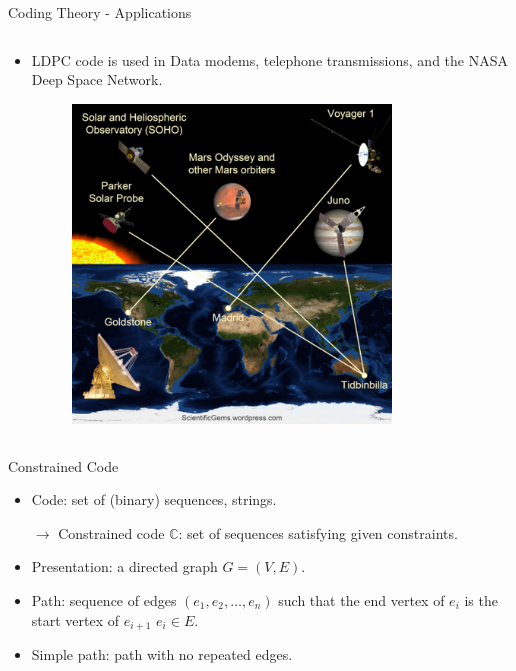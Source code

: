 \begin{frame}{Coding Theory - Applications}
\begin{columns}
        \begin{column}{0.5\textwidth}
            \begin{itemize}
                \vfill \item LDPC code is used in Data modems, telephone transmissions, and the NASA Deep Space Network.
                \begin{figure}
                    \centering
                    \includegraphics[width=0.8\textwidth,height=0.6\textheight]{Images/Introduction/NASA.png}
                \end{figure}
            \end{itemize}
        \end{column}
    \end{columns}
\end{frame}


\begin{frame}{Constrained Code}
    \begin{itemize}
        \vfill \item Code: set of (binary) sequences, strings.
        
        $\rightarrow$ Constrained code $\mathbb{C}$: set of sequences satisfying given constraints.
        \vfill \item Presentation: a directed graph $G=(V,E)$.
        \vfill \item Path: sequence of edges $\left(e_{1},e_{2},\ldots,e_{n}\right)$ such that the end vertex of $e_{i}$ is the start vertex of $e_{i+1}$ $e_{i}\in E$. 
        \vfill \item Simple path: path with no repeated edges.
    \end{itemize}
\end{frame}



